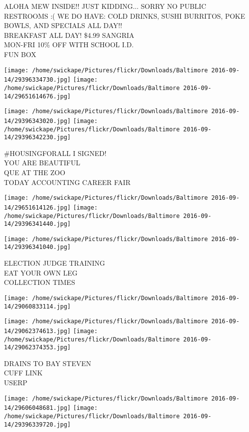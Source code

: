 \documentclass[10pt,letterpaper]{article}
\begin{document}
ALOHA MEW INSIDE!! JUST KIDDING...  SORRY NO PUBLIC RESTROOMS :( WE DO HAVE: COLD DRINKS, SUSHI BURRITOS, POKE BOWLS, AND SPECIALS ALL DAY!!\\
BREAKFAST ALL DAY!  \$4.99 SANGRIA\\
MON{-}FRI 10\% OFF WITH SCHOOL I.D.\\
FUN BOX
\pagebreak

\texttt{[image: /home/swickape/Pictures/flickr/Downloads/Baltimore 2016-09-14/29396334730.jpg]}
\texttt{[image: /home/swickape/Pictures/flickr/Downloads/Baltimore 2016-09-14/29651614676.jpg]}

\texttt{[image: /home/swickape/Pictures/flickr/Downloads/Baltimore 2016-09-14/29396343020.jpg]}
\texttt{[image: /home/swickape/Pictures/flickr/Downloads/Baltimore 2016-09-14/29396342230.jpg]}

\#HOUSINGFORALL I SIGNED!\\
YOU ARE BEAUTIFUL\\
QUE AT THE ZOO\\
TODAY ACCOUNTING CAREER FAIR
\pagebreak

\texttt{[image: /home/swickape/Pictures/flickr/Downloads/Baltimore 2016-09-14/29651614126.jpg]}
\texttt{[image: /home/swickape/Pictures/flickr/Downloads/Baltimore 2016-09-14/29396341440.jpg]}

\texttt{[image: /home/swickape/Pictures/flickr/Downloads/Baltimore 2016-09-14/29396341040.jpg]}

ELECTION JUDGE TRAINING\\
EAT YOUR OWN LEG\\
COLLECTION TIMES
\pagebreak

\texttt{[image: /home/swickape/Pictures/flickr/Downloads/Baltimore 2016-09-14/29060833114.jpg]}

\vspace{0.25in}
\texttt{[image: /home/swickape/Pictures/flickr/Downloads/Baltimore 2016-09-14/29062374613.jpg]}
\texttt{[image: /home/swickape/Pictures/flickr/Downloads/Baltimore 2016-09-14/29062374353.jpg]}

DRAINS TO BAY STEVEN\\
CUFF LINK\\
USERP
\pagebreak

\texttt{[image: /home/swickape/Pictures/flickr/Downloads/Baltimore 2016-09-14/29606048681.jpg]}
\texttt{[image: /home/swickape/Pictures/flickr/Downloads/Baltimore 2016-09-14/29396339720.jpg]}
\end{document}
